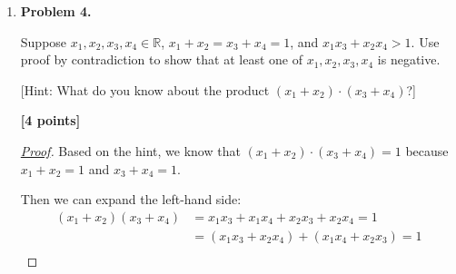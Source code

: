 \documentclass[11pt]{article}
\begin{document}
\begin{enumerate}
\begin{proof}[\underline{Proof}]
\

\underline{Base case.} Prove for \(n=0\). LHS = \(\displaystyle\sum_{i=0}^{0} 2^i = 2^0 = 1\). RHS = \(2^{0+1} - 1 = 2^1 - 1 = 1\). LHS = RHS, so the base case holds.

\underline{Inductive hypothesis.} We assume that the \(\displaystyle\sum_{i=0}^{n} 2^i = 2^{n+1} - 1\) is true for some \(n \in \mathbb{N}\).

\underline{Inductive step.} Proof for \(n+1\):
\(\displaystyle\sum_{i=0}^{n+1} 2^i = 2^{(n+1)+1} - 1\)

\[
\begin{aligned}
    \sum_{i=0}^{n+1} 2^i &= 2^0 + 2^1 + 2^2 + \ldots + 2^n + 2^{n+1} \\
    &= \sum_{i=0}^{n+1} 2^i + 2^{n+1} \\
    &= (2^{n+1} - 1) + 2^{n+1}\\
    &= 2(2^{n+1}) - 1 = 2^{n+2} - 1
\end{aligned}
\]

We shows that LSH = RHS.

\underline{Conclusion.} \(\displaystyle\sum_{i=0}^{n} 2^i = 2^{n+1} - 1\) holds for all natural numbers \(n \in \mathbb{N}\).

\end{proof}

\item \textbf{Problem 4.}

Suppose \(x_1, x_2, x_3, x_4 \in \mathbb{R}\), \(x_1 + x_2 = x_3 + x_4 = 1\), and \(x_1x_3 + x_2x_4 >1\). Use proof by contradiction to show that at least one of \(x_1, x_2, x_3, x_4\) is negative.

[Hint: What do you know about the product \((x_1 + x_2)\cdot(x_3 + x_4)\)?]

\begin{flushright}
\textbf{[4 points]}
\end{flushright}

\begin{proof}[\underline{Proof}]

Based on the hint, we know that \((x_1 + x_2)\cdot(x_3 + x_4) = 1\) because \(x_1 + x_2 = 1\) and \(x_3 + x_4 = 1\).

Then we can expand the left-hand side:
\[
\begin{aligned}
(x_1 + x_2)(x_3 + x_4) &= x_1x_3 + x_1x_4 + x_2x_3 + x_2x_4 = 1\\
&= (x_1x_3 + x_2x_4) + (x_1x_4 + x_2x_3) = 1\\
\end{aligned}
\]


\end{proof}
\end{enumerate}
\end{document}
